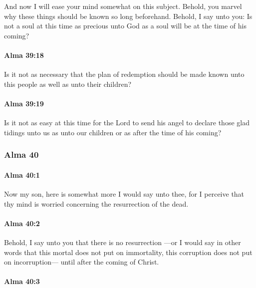 			And now I will ease your mind somewhat on this subject.
			Behold, you marvel why these things should be known so long beforehand.
			Behold, I say unto you:
			Is not a soul at this time as precious unto God
			as a soul will be at the time of his coming?

		\paragraph{Alma 39:18} %
			\label{ALMA-39-18}

			Is it not as necessary that the plan of redemption should be made known
			unto this people as well as unto their children?

		\paragraph{Alma 39:19} %
			\label{ALMA-39-19}

			Is it not as easy at this time
			for the Lord to send his angel to declare those glad tidings
			unto us as unto our children
			or as after the time of his coming?

	\subsubsection{Alma 40} %
		\label{ALMA-40}
		
		\paragraph{Alma 40:1} %
			\label{ALMA-40-1}

			Now my son, here is somewhat more I would say unto thee,
			for I perceive that thy mind is worried concerning the resurrection of the dead.

		\paragraph{Alma 40:2} %
			\label{ALMA-40-2}

			Behold, I say unto you that there is no resurrection
			---or I would say in other words
			that this mortal does not put on immortality,
			this corruption does not put on incorruption---
			until after the coming of Christ.

		\paragraph{Alma 40:3} %
			\label{ALMA-40-3}


